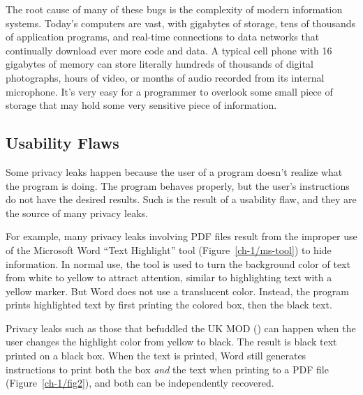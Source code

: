 The root cause of many of these bugs is the complexity
of modern information systems. Today's computers are vast, with
gigabytes of storage, tens of thousands of application programs, and
real-time connections to data networks that continually download ever 
more code and data. A typical cell phone with 16 gigabytes of memory can
store literally hundreds of thousands of digital photographs, hours of
video, or months of audio recorded from its internal
microphone. It's very easy for a programmer to overlook some small
piece of storage that may hold some very sensitive piece of
information. 

\subsection{Usability Flaws \DONE}

Some privacy leaks happen because the user of a program doesn't
realize what the program is doing. The program behaves properly,
but the user's instructions do not have the desired results. Such is
the result of a usability flaw, and they are the source of many
privacy leaks. 

For example, many privacy leaks involving PDF files 
result from the improper use of the Microsoft Word ``Text Highlight''
tool (Figure~\ref{ch-1/ms-tool}) to hide information.  In normal use, the tool is used to turn
the background color of text from white to yellow to attract
attention, similar to highlighting text with a yellow marker. But Word
does not use a translucent color. Instead, the program prints
highlighted text by first printing the colored box, then the black
text.


Privacy leaks such as those that befuddled the UK MOD
(\pageref{uk-mod}) can happen when the user changes the highlight color
from yellow to black. The result is black text printed on a black box.
When the text is printed, Word still generates instructions to print
both the box \emph{and} the text when printing to a PDF file
(Figure~\ref{ch-1/fig2}), and both can be independently recovered.


